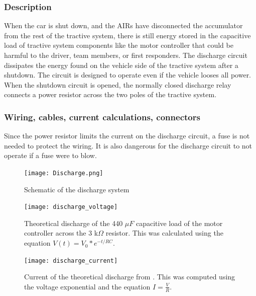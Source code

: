 \documentclass{article}
\begin{document}
\subsubsection{Description}
When the car is shut down, and the AIRs have disconnected the accumulator from the rest of the tractive system, there is still energy stored in the capacitive load of tractive system components like the motor controller that could be harmful to the driver, team members, or first responders. The discharge circuit dissipates the energy found on the vehicle side of the tractive system after a shutdown. The circuit is designed to operate even if the vehicle looses all power. When the shutdown circuit is opened, the normally closed discharge relay connects a power resistor across the two poles of the tractive system.  

\subsubsection{Wiring, cables, current calculations, connectors}

Since the power resistor limits the current on the discharge circuit, a fuse is not needed to protect the wiring. It is also dangerous for the discharge circuit to not operate if a fuse were to blow. 

\begin{figure}[H]
    \centering
    \texttt{[image: Discharge.png]}
    \caption{Schematic of the discharge system}
    \label{discharge_schem}
\end{figure}

\begin{figure}[H]
    \centering
    \texttt{[image: discharge\_voltage]}
    \caption{Theoretical discharge of the 440 $\mu F$ capacitive load of the motor controller across the 3 k$\Omega$ resistor. This was calculated using the equation $V(t) = V_{0} * e^{-t/RC}$.}
    \label{fig:discharge_voltage}
\end{figure}

\begin{figure}[H]
    \centering
    \texttt{[image: discharge\_current]}
    \caption{Current of the theoretical discharge from . This was computed using the voltage exponential and the equation $I = \frac{V}{R}$.}
    \label{fig:discharge_current}
\end{figure}
\end{document}
